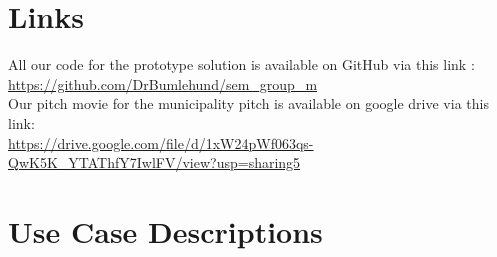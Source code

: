
\setcounter{page}{1}
\begin{appendices}


	\section{Links} \label{app:links}
	All our code for the prototype solution is available on GitHub via this link :\\ \url{https://github.com/DrBumlehund/sem_group_m}\\

	Our pitch movie for the municipality pitch is available on google drive via this link:\\
	\url{https://drive.google.com/file/d/1xW24pWf063qs-QwK5K_YTAThfY7IwlFV/view?usp=sharing5}

	\section{Use Case Descriptions} \label{app:ucd}
	
	

\end{appendices}